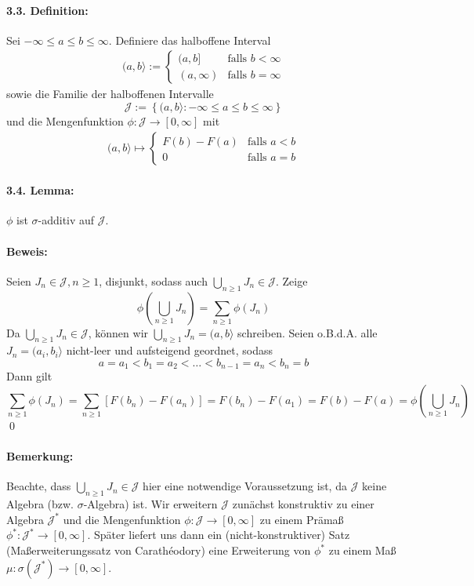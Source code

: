 \paragraph{3.3. Definition:}Sei $-\infty\leq a\leq b\leq\infty$. Definiere das halboffene Interval
\begin{align*}
    (a,b\rangle:=
\begin{cases}
    (a,b] &\text{falls }b<\infty \\
    (a,\infty)&\text{falls }b=\infty
\end{cases}
\end{align*}
sowie die Familie der halboffenen Intervalle
$$\mathcal{J}:=\left\{(a,b\rangle:-\infty\leq a\leq b\leq\infty\right\}
$$
und die Mengenfunktion $\phi:\mathcal{J}\to[0,\infty]$ mit
\begin{align*}
    (a,b\rangle\mapsto
    \begin{cases}
        F(b)-F(a)&\text{falls }a<b\\
        0&\text{falls }a=b
    \end{cases}
\end{align*}

\paragraph{3.4. Lemma:}$\phi$ ist $\sigma$-additiv auf $\mathcal{J}$.

\paragraph{Beweis:}Seien $J_n\in\mathcal{J},n\geq1$, disjunkt, sodass auch $\bigcup_{n\geq1}J_n\in\mathcal{J}$. Zeige 
$$\phi\left(\bigcup_{n\geq1}J_n\right)=\sum_{n\geq1}\phi(J_n)$$
Da $\bigcup_{n\geq1}J_n\in\mathcal{J}$, k\"onnen wir $\bigcup_{n\geq1}J_n=(a,b\rangle$ schreiben. Seien o.B.d.A. alle $J_n=(a_i,b_i\rangle$ nicht-leer und aufsteigend geordnet, sodass
$$a=a_1<b_1=a_2<\hdots<b_{n-1}=a_n<b_n=b$$ 
Dann gilt 
$$\sum_{n\geq1}\phi(J_n)=\sum_{n\geq1}[F(b_n)-F(a_n)]=F(b_n)-F(a_1)=F(b)-F(a)=\phi\left(\bigcup_{n\geq1}J_n\right)$$
\qed

\paragraph{Bemerkung:}Beachte, dass $\bigcup_{n\geq1}J_n\in\mathcal{J}$ hier eine notwendige Voraussetzung ist, da $\mathcal{J}$ keine Algebra (bzw. $\sigma$-Algebra) ist. Wir erweitern $\mathcal{J}$ zun\"achst konstruktiv zu einer Algebra $\mathcal{J}^*$ und die Mengenfunktion $\phi:\mathcal{J}\to[0,\infty]$ zu einem Pr\"ama\ss{} $\phi^*:\mathcal{J}^*\to[0,\infty]$. Sp\"ater liefert uns dann ein (nicht-konstruktiver) Satz (Ma\ss{}erweiterungssatz von Carath\'eodory) eine Erweiterung von $\phi^*$ zu einem Ma\ss{} $\mu:\sigma(\mathcal{J}^*)\to[0,\infty]$.

